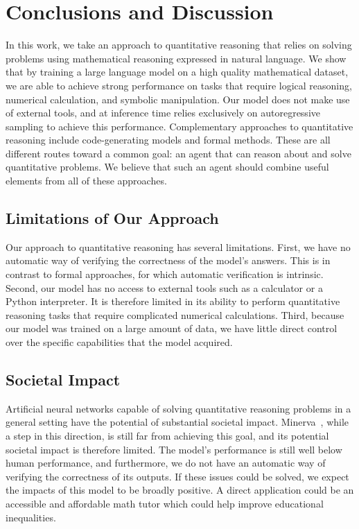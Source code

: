 \documentclass{article}
\newcommand{\ourmodel}[0]{{Minerva~}}
\begin{document}
\section{Conclusions and Discussion}
\label{sec:conclusion}
In this work, we take an approach to quantitative reasoning that relies on solving problems using mathematical reasoning expressed in natural language. 
We show that by training a large language model on a high quality mathematical dataset, we are able to achieve strong performance on tasks that require logical reasoning, numerical calculation, and symbolic manipulation. Our model does not make use of external tools, and at inference time relies exclusively on autoregressive sampling to achieve this performance.
Complementary approaches to quantitative reasoning include code-generating models and formal methods. These are all different routes toward a common goal: an agent that can reason about and solve quantitative problems. We believe that such an agent should combine useful elements from all of these approaches. 


\subsection{Limitations of Our Approach}
Our approach to quantitative reasoning has several limitations. First, we have no automatic way of verifying the correctness of the model's answers. This is in contrast to formal approaches, for which automatic verification is intrinsic. Second, our model has no access to external tools such as a calculator or a Python interpreter. It is therefore limited in its ability to perform quantitative reasoning tasks that require complicated numerical calculations. Third, because our model was trained on a large amount of data, we have little direct control over the specific capabilities that the model acquired.

\subsection{Societal Impact}
Artificial neural networks capable of solving quantitative reasoning problems in a general setting have the potential of substantial societal impact. \ourmodel\!, while a step in this direction, is still far from achieving this goal, and its potential societal impact is therefore limited. The model's performance is still well below human performance, and furthermore, we do not have an automatic way of verifying the correctness of its outputs. If these issues could be solved, we expect the impacts of this model to be broadly positive. A direct application could be an accessible and affordable math tutor which could help improve educational inequalities.
\end{document}
